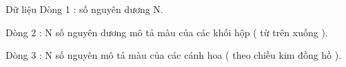 Dữ liệu
Dòng 1 : số nguyên dương N.   


   Dòng 2 : N số nguyên dương mô tả màu của các khối hộp ( từ   trên xuống ).   


   Dòng 3 : N số nguyên mô tả màu của các cánh hoa ( theo chiều   kim đồng hồ ).